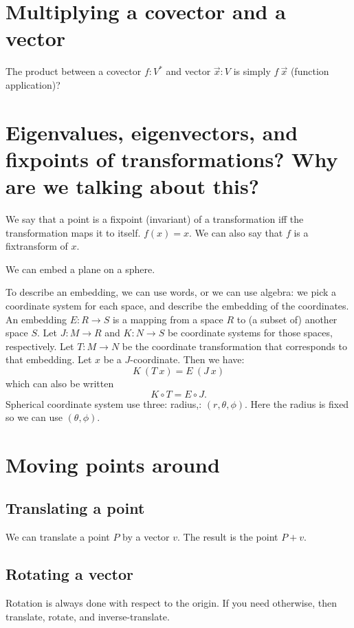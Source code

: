 \section{Multiplying a covector and a vector}

The product between a covector $f : V^*$ and vector $\vec{x} : V$
is simply $f~\vec{x}$ (function application)?

\section{Eigenvalues, eigenvectors, and fixpoints of transformations? Why are we talking about this?}

We say that a point is a fixpoint (invariant)
of a transformation iff the transformation maps it to itself.
$f(x) = x$.
We can also say that $f$ is a fixtransform of $x$.

We can embed a plane on a sphere.

To describe an embedding,
we can use words, or we can use algebra:
we pick a coordinate system for each space,
and describe the embedding of the coordinates.
An embedding $E : R \to S$ is a mapping from a space $R$ to (a subset of) another space $S$.
Let $J : M \to R$ and $K : N \to S$ be coordinate systems for those spaces, respectively.
Let $T : M \to N$ be the coordinate transformation that corresponds to that embedding.
Let $x$ be a $J$-coordinate.
Then we have:
\[
K~(T~x) = E~(J~x)
\]
which can also be written
\[
K \circ T = E \circ J.
\]
Spherical coordinate system
use three: radius,: $(r,\theta,\phi)$. Here the radius is fixed so we can use $(\theta,\phi)$.

\section{Moving points around}

\subsection{Translating a point}

We can translate a point \(P\) by a vector \(v\).
The result is the point \(P + v\).

\subsection{Rotating a vector}

Rotation is always done with respect to the origin.
If you need otherwise, then translate, rotate, and inverse-translate.

